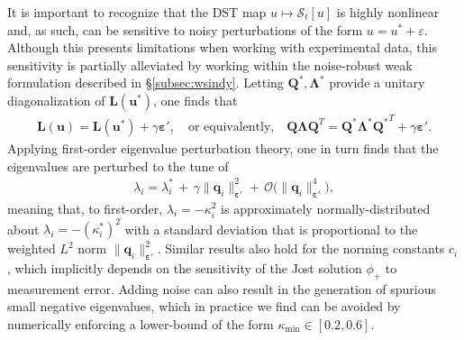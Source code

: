 \documentclass[journal=gmj]{CUP-JNL-DTM}%
\theoremstyle{definition}
\numberwithin{equation}{section}
\begin{document}
It is important to recognize that the DST map $u \mapsto \mathcal{S}_t[u]$ is highly nonlinear and, as such, can be sensitive to noisy perturbations of the form $u = u^* + \varepsilon$. Although this presents limitations when working with experimental data, this sensitivity is partially alleviated by working within the noise-robust weak formulation described in \S\ref{subsec:wsindy}. Letting $\mathbf{Q}^*, \mathbf{\Lambda}^*$ provide a unitary diagonalization of $\mathbf{L}(\mathbf{u}^*)$, one finds that \begin{align*}
    \mathbf{L}(\mathbf{u}) = \mathbf{L}(\mathbf{u}^*) + \gamma\boldsymbol{\varepsilon}',
    \quad \text{or equivalently,} \quad
    \mathbf{Q \Lambda Q}^T = \mathbf{Q}^*\mathbf{\Lambda}^*{\mathbf{Q}^*}^T + \gamma\boldsymbol{\varepsilon}'.
\end{align*} Applying first-order eigenvalue perturbation theory, one in turn finds that the eigenvalues are perturbed to the tune of \begin{align*}
    \lambda_i = \lambda^*_{i} \, + \, \gamma\|\mathbf{q}_i\|^2_{\boldsymbol{\varepsilon}'} + \, \mathcal{O}\big(\|\mathbf{q}_i\|^4_{\boldsymbol{\varepsilon}'}\big),
\end{align*} meaning that, to first-order, $\lambda_i = -\kappa^2_i$ is approximately normally-distributed about $\lambda_i = -(\kappa^*_i)^2$ with a standard deviation that is proportional to the weighted $L^2$ norm $\|\mathbf{q}_i\|^2_{\boldsymbol{\varepsilon}'}$. Similar results also hold for the norming constants $c_i$, which implicitly depends on the sensitivity of the Jost solution $\phi_{+}$ to measurement error. Adding noise can also result in the generation of spurious small negative eigenvalues, which in practice we find can be avoided by numerically enforcing a lower-bound of the form $\kappa_{\min} \in [0.2, 0.6]$.

\clearpage
\end{document}
